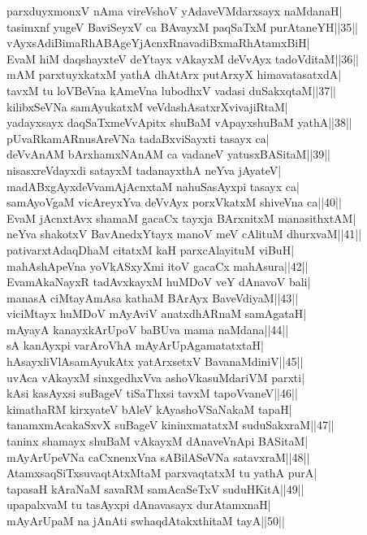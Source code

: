 \documentclass{article}
\begin{document}
parxduyxmonxV nAma vireVshoV yAdaveVMdarxsayx naMdanaH|\\
tasimxnf yugeV BaviSeyxV ca BAvayxM paqSaTxM purAtaneYH||35||\\
vAyxsAdiBimaRhABAgeYjAcnxRnavadiBxmaRhAtamxBiH|\\
EvaM hiM daqshayxteV deYtayx vAkayxM deVvAyx tadoVditaM||36||\\
mAM parxtuyxkatxM yathA dhAtArx putArxyX himavatasatxdA|\\
tavxM tu loVBeVna kAmeVna lubodhxV vadasi duSakxqtaM||37||\\
kilibxSeVNa samAyukatxM veVdashAsatxrXvivajiRtaM|\\
yadayxsayx daqSaTxmeVvApitx shuBaM vApayxshuBaM yathA||38||\\
pUvaRkamARnusAreVNa tadaBxviSayxti tasayx ca|\\
deVvAnAM bArxhamxNAnAM ca vadaneV yatusxBASitaM||39||\\
nisasxreVdayxdi satayxM tadanayxthA neYva jAyateV|\\
madABxgAyxdeVvamAjAcnxtaM nahuSasAyxpi tasayx ca|\\
samAyoVgaM vicAreyxYva deVvAyx porxVkatxM shiveVna ca||40||\\
EvaM jAcnxtAvx shamaM gacaCx tayxja BArxnitxM manasithxtAM|\\
neYva shakotxV BavAnedxYtayx manoV meV cAlituM dhurxvaM||41||\\
pativarxtAdaqDhaM citatxM kaH parxcAlayituM viBuH|\\
mahAshApeVna yoVkASxyXmi itoV gacaCx mahAsura||42||\\
EvamAkaNayxR tadAvxkayxM huMDoV veY dAnavoV bali|\\
manasA ciMtayAmAsa kathaM BArAyx BaveVdiyaM||43||\\
viciMtayx huMDoV mAyAviV anatxdhARnaM samAgataH|\\
mAyayA kanayxkArUpoV baBUva mama naMdana||44||\\
sA kanAyxpi varAroVhA mAyArUpAgamatatxtaH|\\
hAsayxliVlAsamAyukAtx yatArxsetxV BavanaMdiniV||45||\\
uvAca vAkayxM sinxgedhxVva ashoVkasuMdariVM parxti|\\
kAsi kasAyxsi suBageV tiSaThxsi tavxM tapoVvaneV||46||\\
kimathaRM kirxyateV bAleV kAyashoVSaNakaM tapaH|\\
tanamxmAcakaSxvX suBageV kininxmatatxM suduSakxraM||47||\\
taninx shamayx shuBaM vAkayxM dAnaveVnApi BASitaM|\\
mAyArUpeVNa caCxnenxVna sABilASeVNa satavxraM||48||\\
AtamxsaqSiTxsuvaqtAtxMtaM parxvaqtatxM tu yathA purA|\\
tapasaH kAraNaM savaRM samAcaSeTxV suduHKitA||49||\\
upapalxvaM tu tasAyxpi dAnavasayx durAtamxnaH|\\
mAyArUpaM na jAnAti swhaqdAtakxthitaM tayA||50||\\
\end{document}
